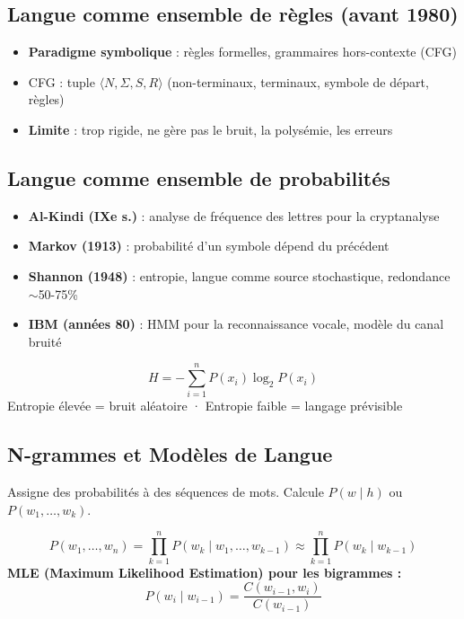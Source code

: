 \documentclass[a4paper,10pt]{article}
\begin{document}
\subsection{Langue comme ensemble de règles (avant 1980)}
\begin{itemize}
  \item \textbf{Paradigme symbolique} : règles formelles, grammaires hors-contexte (CFG)
  \item CFG : tuple $\langle N, \Sigma, S, R \rangle$ (non-terminaux, terminaux, symbole de départ, règles)
  \item \textbf{Limite} : trop rigide, ne gère pas le bruit, la polysémie, les erreurs
\end{itemize}

\subsection{Langue comme ensemble de probabilités}

\begin{itemize}
  \item \textbf{Al-Kindi (IXe s.)} : analyse de fréquence des lettres pour la cryptanalyse
  \item \textbf{Markov (1913)} : probabilité d'un symbole dépend du précédent
  \item \textbf{Shannon (1948)} : entropie, langue comme source stochastique, redondance $\sim$50-75\%
  \item \textbf{IBM (années 80)} : HMM pour la reconnaissance vocale, modèle du canal bruité
\end{itemize}

\begin{formulebox}
\[
H = -\sum_{i=1}^{n} P(x_i) \log_2 P(x_i)
\]
Entropie élevée = bruit aléatoire · Entropie faible = langage prévisible
\end{formulebox}

\subsection{N-grammes et Modèles de Langue}

\begin{definitionbox}
Assigne des probabilités à des séquences de mots. Calcule $P(w \mid h)$ ou $P(w_1, \ldots, w_k)$.
\end{definitionbox}

\begin{formulebox}
\[
P(w_1, \ldots, w_n) = \prod_{k=1}^{n} P(w_k \mid w_1, \ldots, w_{k-1}) \approx \prod_{k=1}^{n} P(w_k \mid w_{k-1})
\]
\textbf{MLE (Maximum Likelihood Estimation) pour les bigrammes :}
\[
P(w_i \mid w_{i-1}) = \frac{C(w_{i-1}, w_i)}{C(w_{i-1})}
\]
\end{formulebox}
\end{document}
